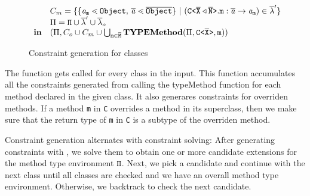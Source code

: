 \documentclass[a4paper,USenglish,cleveref, autoref, thm-restate]{lipics-v2021}
\begin{document}
\begin{figure}[tp]
\begin{gather*}
\begin{array}{@{}l@{}l}
\begin{array}{ll@{}l}
                               & \consSet_m = \set{ \set{\tv{a}_{\mv m} \lessdot \type{Object}, \, \ol{\tv{a}} \lessdot \ol{\type{Object}}}
                                \ |\ (\exptype{C}{\ol{X} \triangleleft \ol{N}}.\mv{m} : \ol{\tv{a}} \to \tv{a}_{\mv m}) \in \ol{\methodAssumption}'} \\
                               & \Pi = \mv{\Pi} \cup
                                 \ol{\methodAssumption}' \cup
                                 \ol{\methodAssumption}_o \\
                  \textbf{in} 
                               & { ( \Pi, 
                                 \consSet_o \cup \consSet_m \cup
                                 \bigcup_{\texttt{m} \in \ol{M}}
                                 \typeMethod(\Pi, \exptype{C}{\ol{X}},  \mathtt{m}))
                                 } 
                \end{array}
    \end{array}
  \end{gather*}
  \caption{Constraint generation for classes}
  \label{fig:constraints-for-classes}
\end{figure}


The \fjtype function gets called for every class in the input.
This function accumulates all the constraints generated from calling the
typeMethod function for each method declared in the given class.
It also generares constraints for overriden methods.
If a method \texttt{m} in \texttt{C} overrides a method in its superclass,
then we make sure that the return type of \texttt{m} in \texttt{C} is
a subtype of the overriden method.
\fi

Constraint generation alternates with constraint solving: After
generating constraints with {\fjtype}, we solve them to obtain one or
more candidate extensions for the method type environment
${\tt \Pi}$. Next, we pick a candidate and continue with the next class
until all classes are checked and we have an overall method type
environment.  Otherwise, we backtrack to check the next candidate. 
\end{document}
